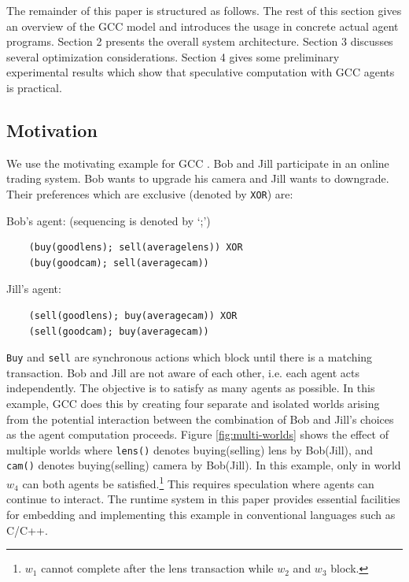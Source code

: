 \documentclass[preprint,10pt]{sigplanconf}
\newcommand{\monospace}[1]{\texttt{\small #1}}
\begin{document}
The remainder of this paper is structured as follows. 
The rest of this section gives an overview of the GCC model and 
introduces the usage in concrete actual agent programs. 
Section 2 presents the overall system architecture. 
Section 3 discusses several optimization considerations. 
Section 4 gives some preliminary experimental results which
show that speculative computation with GCC agents is practical.

\subsection{Motivation}

We use the motivating example for GCC \cite{JaffarYZ07}. 
Bob and Jill participate in an online trading system. 
Bob wants to upgrade his camera and Jill wants to downgrade. 
Their preferences which are exclusive
(denoted by \monospace{XOR}) are:

Bob's agent: (sequencing is denoted by `;')
{\small \vspace{-2mm}
\begin{verbatim}
    (buy(goodlens); sell(averagelens)) XOR
    (buy(goodcam); sell(averagecam))
\end{verbatim}
\vspace{-1mm}}

Jill's agent:
{\small \vspace{-2mm}
\begin{verbatim}
    (sell(goodlens); buy(averagecam)) XOR
    (sell(goodcam); buy(averagecam))
\end{verbatim}
\vspace{-1mm}}

\monospace{Buy} and \monospace{sell} are synchronous actions which block
until there is a matching transaction.
Bob and Jill are not aware of each other, i.e. each agent acts independently. 
The objective is to satisfy as many agents as possible. 
In this example, GCC does this by creating four separate and 
isolated worlds arising from the potential interaction between
the combination of Bob and Jill's choices as the agent computation proceeds. 
Figure \ref{fig:multi-worlds} shows the effect of multiple worlds 
where {\tt lens()} denotes buying(selling) lens by Bob(Jill),
and {\tt cam()} denotes buying(selling) camera by Bob(Jill).
In this example, only in world $w_4$ can both agents be satisfied.\footnote{
$w_1$ cannot complete after the lens transaction while $w_2$ and
$w_3$ block.
}
This requires speculation where agents can continue to interact. 
The runtime system in this paper provides essential facilities  
  for embedding and implementing this example in 
  conventional languages such as C/C++. 
\end{document}
